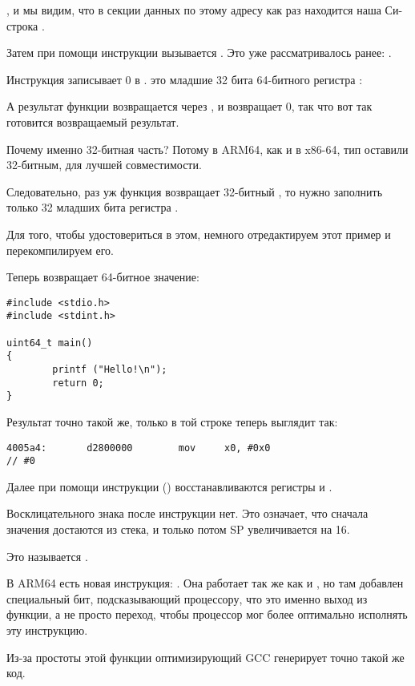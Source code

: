 , и мы видим, что в секции данных  по этому адресу как раз находится наша
Си-строка .

Затем при помощи инструкции  вызывается \puts. Это уже рассматривалось ранее: .

Инструкция \MOV записывает 0 в . 
 это младшие 32 бита 64-битного регистра :



А результат функции возвращается через , и \main возвращает 0, 
так что вот так готовится возвращаемый результат.

Почему именно 32-битная часть?
Потому в ARM64, как и в x86-64, тип \Tint оставили 32-битным, для лучшей совместимости.

Следовательно, раз уж функция возвращает 32-битный \Tint, то нужно заполнить только 32 младших бита регистра .

Для того, чтобы удостовериться в этом, немного отредактируем этот пример и перекомпилируем его.%

Теперь \main возвращает 64-битное значение:

\begin{lstlisting}[caption=\main возвращающая значение типа \TT{uint64\_t}]
#include <stdio.h>
#include <stdint.h>

uint64_t main()
{
        printf ("Hello!\n");
        return 0;
}
\end{lstlisting}

Результат точно такой же, только \MOV в той строке теперь выглядит так:

\begin{lstlisting}[caption=\NonOptimizing GCC 4.8.1 + objdump]
  4005a4:       d2800000        mov     x0, #0x0                        // #0
\end{lstlisting}

Далее при помощи инструкции  () восстанавливаются регистры  и .

Восклицательного знака после инструкции нет. Это означает, что сначала значения достаются из стека, и только потом \ac{SP} увеличивается на 16.

Это называется .

В ARM64 есть новая инструкция: \RET. 
Она работает так же как и , но там добавлен специальный бит,
подсказывающий процессору, что это именно выход из функции, а не просто переход, чтобы процессор
мог более оптимально исполнять эту инструкцию.

Из-за простоты этой функции оптимизирующий GCC генерирует точно такой же код.

